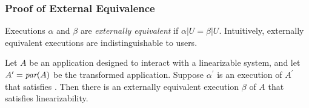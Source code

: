 \subsubsection{Proof of External Equivalence}

Executions $\alpha$ and $\beta$ are
\textit{externally equivalent} if $\alpha|U = \beta|U$. Intuitively,
externally equivalent executions are indistinguishable to users.

\begin{thm}
Let $A$ be an application designed to interact with a linearizable system,
and let $A^\prime = \operatorname*{\textit{par}}(A)$ be the transformed application. Suppose
$\alpha^\prime$ is an execution of $A^\prime$ that satisfies
\MDL{}. Then there is an externally equivalent execution $\beta$
of $A$ that satisfies linearizability.
\end{thm}

